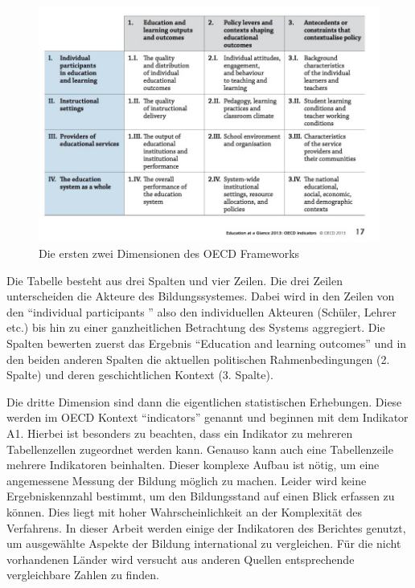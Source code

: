 \begin{figure}[H]
\includegraphics[width=13cm]{./images/oecdframe.jpg}
\center
\caption{Die ersten zwei Dimensionen des OECD Frameworks \cite[17]{oecd5} }
\end{figure}



Die Tabelle besteht aus drei Spalten und vier Zeilen. Die drei Zeilen unterscheiden die Akteure des Bildungssystemes. Dabei wird in den Zeilen von den ``individual participants '' also den individuellen Akteuren (Schüler, Lehrer etc.) bis hin zu einer ganzheitlichen Betrachtung des Systems aggregiert. Die Spalten bewerten zuerst das Ergebnis ``Education and learning outcomes'' und in den beiden anderen Spalten die aktuellen politischen Rahmenbedingungen (2. Spalte) und deren geschichtlichen Kontext (3. Spalte).

Die dritte Dimension sind dann die eigentlichen statistischen Erhebungen. Diese werden im OECD Kontext ``indicators'' genannt und beginnen mit dem Indikator A1.
Hierbei ist besonders zu beachten, dass ein Indikator zu mehreren Tabellenzellen zugeordnet werden kann. Genauso kann auch eine Tabellenzeile mehrere Indikatoren beinhalten.
Dieser komplexe Aufbau ist nötig, um eine angemessene Messung der Bildung möglich zu machen. Leider wird keine Ergebniskennzahl bestimmt, um den Bildungsstand auf einen Blick erfassen zu können. Dies liegt mit hoher Wahrscheinlichkeit an der Komplexität des Verfahrens.
In dieser Arbeit werden einige der Indikatoren des Berichtes genutzt, um ausgewählte Aspekte der Bildung international zu vergleichen. Für die nicht vorhandenen Länder wird versucht aus anderen Quellen entsprechende vergleichbare Zahlen zu finden.

